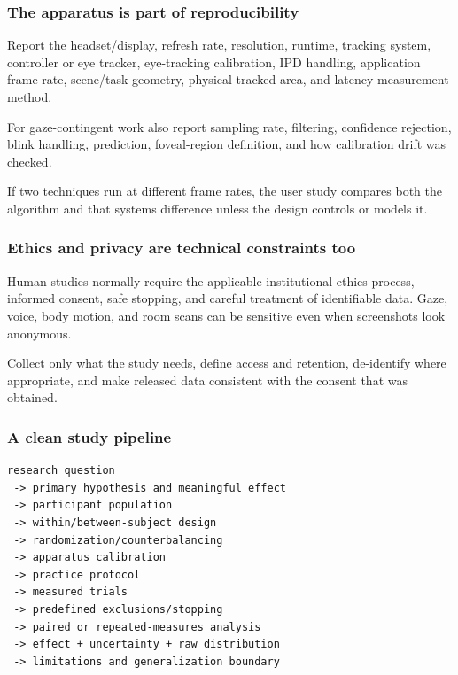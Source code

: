 \subsubsection{The apparatus is part of reproducibility}\label{04-visual-computing-ii-ch035-the-apparatus-is-part-of-reproducibility}

\hypertarget{04-visual-computing-ii-ch035-the-apparatus-is-part-of-reproducibility}{}

Report the headset/display, refresh rate, resolution, runtime, tracking system, controller or eye tracker, eye-tracking calibration, IPD handling, application frame rate, scene/task geometry, physical tracked area, and latency measurement method.

For gaze-contingent work also report sampling rate, filtering, confidence rejection, blink handling, prediction, foveal-region definition, and how calibration drift was checked.

If two techniques run at different frame rates, the user study compares both the algorithm and that systems difference unless the design controls or models it.

\subsubsection{Ethics and privacy are technical constraints too}\label{04-visual-computing-ii-ch035-ethics-and-privacy-are-technical-constraints-too}

\hypertarget{04-visual-computing-ii-ch035-ethics-and-privacy-are-technical-constraints-too}{}

Human studies normally require the applicable institutional ethics process, informed consent, safe stopping, and careful treatment of identifiable data. Gaze, voice, body motion, and room scans can be sensitive even when screenshots look anonymous.

Collect only what the study needs, define access and retention, de-identify where appropriate, and make released data consistent with the consent that was obtained.

\subsubsection{A clean study pipeline}\label{04-visual-computing-ii-ch035-a-clean-study-pipeline}

\hypertarget{04-visual-computing-ii-ch035-a-clean-study-pipeline}{}

\begin{verbatim}
research question
 -> primary hypothesis and meaningful effect
 -> participant population
 -> within/between-subject design
 -> randomization/counterbalancing
 -> apparatus calibration
 -> practice protocol
 -> measured trials
 -> predefined exclusions/stopping
 -> paired or repeated-measures analysis
 -> effect + uncertainty + raw distribution
 -> limitations and generalization boundary
\end{verbatim}


